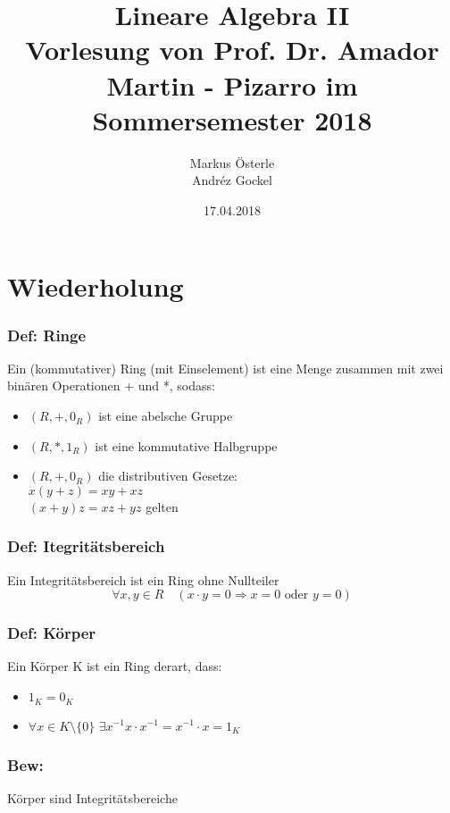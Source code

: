 \documentclass[titlepage,12pt,a4paper,ngerman]{report}
\begin{document}
	
\renewcommand{\thechapter}{\Roman{chapter}}

\title{
	\Huge Lineare Algebra II \\[1em]
	\Large Vorlesung von Prof. Dr. Amador Martin - Pizarro im Sommersemester 2018}
\author{Markus Österle\\ Andréz Gockel}
\date{17.04.2018}
\maketitle
\tableofcontents

\chapter{Wiederholung}
\subsection{Def: Ringe} Ein (kommutativer) Ring (mit Einselement) ist eine Menge zusammen mit zwei binären Operationen + und *, sodass:
\begin{itemize}
	\item $(R,+,0_{R})$ ist eine abelsche Gruppe
	\item $(R,*,1_{R})$  ist eine kommutative Halbgruppe
	\item $(R,+,0_{R})$ die distributiven Gesetze:\\
	$x(y+z) = xy+xz $\\
	$(x+y)z=xz+yz $
	gelten
\end{itemize}

\subsection{Def: Itegritätsbereich} Ein Integritätsbereich ist ein Ring ohne Nullteiler $$\forall x,y \in R \quad (x\cdot y = 0 \Rightarrow x=0\textrm{ oder } y=0)$$ 
\subsection{Def: Körper} Ein Körper K ist ein Ring derart, dass:
\begin{itemize}
	\item $1_{K} = 0_{K}$
	\item $\forall x \in K \setminus \{0\}$ $\exists x^{-1} x\cdot x^{-1} = x^{-1} \cdot x = 1_{K}$
\end{itemize}
\subsection{Bew:} Körper sind Integritätsbereiche
\end{document}
